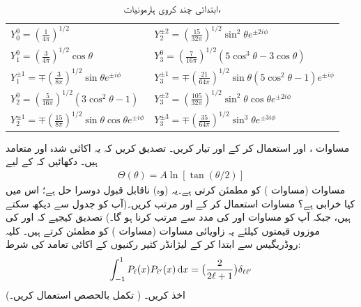 \begin{table}
\caption{ابتدائی چند کروی ہارمونیات، }
\label{جدول_ابعادی_کروی_ہارمونیات}
\renewcommand{\arraystretch}{2} 
\centering
\begin{tabular}{ll}
$Y_0^0=(\frac{1}{4\pi})^{1/2}$ & $Y_2^{\pm 2}=(\frac{15}{32\pi})^{1/2}\sin^2\theta e^{\pm 2 i \phi}$\\
$Y_1^0=(\frac{3}{4\pi})^{1/2}\cos\theta$ & $Y_3^0=(\frac{7}{16\pi})^{1/2}(5\cos^3\theta-3\cos\theta)$\\
$Y_1^{\pm 1}=\mp(\frac{3}{8\pi})^{1/2}\sin\theta e^{\pm i\phi}$ & $Y_3^{\pm 1}=\mp(\frac{21}{64\pi})^{1/2}\sin\theta(5\cos^2\theta-1)e^{\pm i\phi}$\\
$Y_2^0=(\frac{5}{16\pi})^{1/2}(3\cos^2\theta-1)$ & $Y_3^{\pm 2}=(\frac{105}{32\pi})^{1/2}\sin^2\theta\cos\theta e^{\pm 2 i \phi}$\\
$Y_2^{\pm 1}=\mp(\frac{15}{8\pi})^{1/2}\sin\theta\cos\theta e^{\pm i\phi}$ & $Y_3^{\pm3}=\mp(\frac{35}{64\pi})^{1/2}\sin^3\theta e^{\pm 3 i \phi}$
\end{tabular}
\end{table}
مساوات ،  اور  استعمال 
کر کے  اور  تیار کریں۔ تصدیق کریں کہ یہ اکائی شدہ اور متعامد ہیں۔
%
دکھائیں کہ  کے لیے
\begin{align*}
\Theta(\theta)=A\ln[\tan(\theta/2)] 
\end{align*}
 مساوات  (مساوات ) کو مطمئن کرتی ہے۔یہ (وہ) ناقابل قبول دوسرا حل ہے؛ اس میں کیا خرابی ہے؟
%
مساوات  استعمال کر کے  اور 
 مرتب کریں۔(آپ  کو جدول  سے دیکھ سکتے ہیں، جبکہ  آپ کو مساوات  اور  کی مدد سے مرتب کرنا ہو گا۔) تصدیق کیجیے کہ  اور  کی موزوں قیمتوں کیلئے یہ زاویائی مساوات (مساوات ) کو مطمئن کرتے ہیں۔
%
کلیہ روڈریگیس سے ابتدا کر کے لیژانڈر کثیر رکنیوں کے اکائی تعامد کی شرط:
\begin{align}\label{مساوات_تین_عمودیت_لیژانڈر}
\int_{-1}^{1}P_{\ell}(x)P_{\ell'}(x)\dif x=\big(\frac{2}{2\ell+1}\big)\delta_{\ell\ell'} 
\end{align}
اخذ کریں۔ ( تکمل بالحصص استعمال کریں۔)


